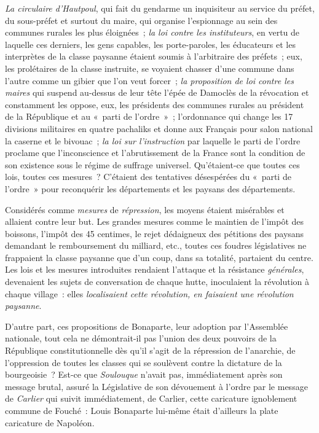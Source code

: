 \documentclass[french,twoside]{book} %
\begin{document}
\emph{La circulaire d’Hautpoul}, qui fait du gendarme un inquisiteur au service du préfet, du sous-préfet et surtout du maire, qui organise l’espionnage au sein des communes rurales les plus éloignées ; \emph{la loi contre les instituteurs}, en vertu de laquelle ces derniers, les gens capables, les porte-paroles, les éducateurs et les interprètes de la classe paysanne étaient soumis à l’arbitraire des préfets ; eux, les prolétaires de la classe instruite, se voyaient chasser d’une commune dans l’autre comme un gibier que l’on veut forcer ; \emph{la proposition de loi contre les maires} qui suspend au-dessus de leur tête l’épée de Damoclès de la révocation et constamment les oppose, eux, les présidents des communes rurales au président de la République et au « parti de l’ordre » ; l’ordonnance qui change les 17 divisions militaires en quatre pachaliks et donne aux Français pour salon national la caserne et le bivouac ; \emph{la loi sur l’instruction} par laquelle le parti de l’ordre proclame que l’inconscience et l’abrutissement de la France sont la condition de son existence sous le régime de suffrage universel. Qu’étaient-ce que toutes ces lois, toutes ces mesures ? C’étaient des tentatives désespérées du « parti de l’ordre » pour reconquérir les départements et les paysans des départements.\par
Considérés comme \emph{mesures} de \emph{répression}, les moyens étaient misérables et allaient contre leur but. Les grandes mesures comme le maintien de l’impôt des boissons, l’impôt des 45 centimes, le rejet dédaigneux des pétitions des paysans demandant le remboursement du milliard, etc., toutes ces foudres législatives ne frappaient la classe paysanne que d’un coup, dans sa totalité, partaient du centre. Les lois et les mesures introduites rendaient l’attaque et la résistance \emph{générales}, devenaient les sujets de conversation de chaque hutte, inoculaient la révolution à chaque village : elles \emph{localisaient cette révolution, en faisaient une révolution paysanne}.\par
D’autre part, ces propositions de Bonaparte, leur adoption par l’Assemblée nationale, tout cela ne démontrait-il pas l’union des deux pouvoirs de la République constitutionnelle dès qu’il s’agit de la répression de l’anarchie, de l’oppression de toutes les classes qui se soulèvent contre la dictature de la bourgeoisie ? Est-ce que \emph{Soulouque} n’avait pas, immédiatement après son message brutal, assuré la Législative de son dévouement à l’ordre par le message de \emph{Carlier} qui suivit immédiatement, de Carlier, cette caricature ignoblement commune de Fouché : Louis Bonaparte lui-même était d’ailleurs la plate caricature de Napoléon.\par
\end{document}
